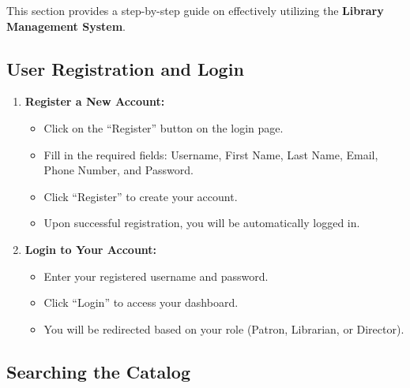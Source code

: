 \documentclass[11pt,a4paper]{article}
\begin{document}
This section provides a step-by-step guide on effectively utilizing the \textbf{Library Management System}.

\subsection{User Registration and Login}

\begin{enumerate}
    \item \textbf{Register a New Account:}
    \begin{itemize}
        \item Click on the ``Register'' button on the login page.
        \item Fill in the required fields: Username, First Name, Last Name, Email, Phone Number, and Password.
        \item Click ``Register'' to create your account.
        \item Upon successful registration, you will be automatically logged in.
    \end{itemize}

    \item \textbf{Login to Your Account:}
    \begin{itemize}
        \item Enter your registered username and password.
        \item Click ``Login'' to access your dashboard.
        \item You will be redirected based on your role (Patron, Librarian, or Director).
    \end{itemize}
\end{enumerate}

\subsection{Searching the Catalog}
\end{document}
